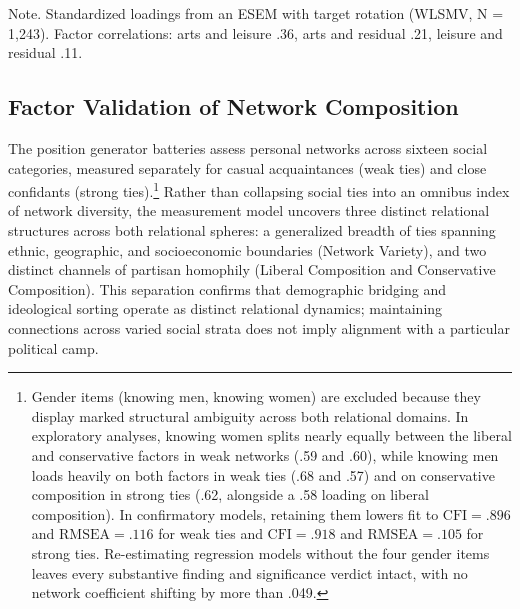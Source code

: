 \documentclass[
  12pt
]{article}
\begin{document}
Note. Standardized loadings from an ESEM with target rotation (WLSMV, N = 1,243). Factor correlations: arts and leisure .36, arts and residual .21, leisure and residual .11.


\subsection{Factor Validation of Network Composition}\label{factor-validation-of-network-composition}

The position generator batteries assess personal networks across sixteen social categories, measured separately for casual acquaintances (weak ties) and close confidants (strong ties).\footnote{Gender items (knowing men, knowing women) are excluded because they display marked structural ambiguity across both relational domains. In exploratory analyses, knowing women splits nearly equally between the liberal and conservative factors in weak networks (.59 and .60), while knowing men loads heavily on both factors in weak ties (.68 and .57) and on conservative composition in strong ties (.62, alongside a .58 loading on liberal composition). In confirmatory models, retaining them lowers fit to $\text{CFI} = .896$ and $\text{RMSEA} = .116$ for weak ties and $\text{CFI} = .918$ and $\text{RMSEA} = .105$ for strong ties. Re-estimating regression models without the four gender items leaves every substantive finding and significance verdict intact, with no network coefficient shifting by more than .049.} Rather than collapsing social ties into an omnibus index of network diversity, the measurement model uncovers three distinct relational structures across both relational spheres: a generalized breadth of ties spanning ethnic, geographic, and socioeconomic boundaries (Network Variety), and two distinct channels of partisan homophily (Liberal Composition and Conservative Composition). This separation confirms that demographic bridging and ideological sorting operate as distinct relational dynamics; maintaining connections across varied social strata does not imply alignment with a particular political camp.
\end{document}
